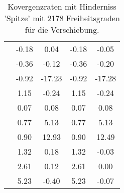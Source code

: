 \begin{table}
\begin{tabular}{c|cc|cc|}
\multicolumn{1}{|c|}{} & \multicolumn{1}{|c|}{     -0.18} & \multicolumn{1}{|c|}{      0.04} & \multicolumn{1}{|c|}{     -0.18} & \multicolumn{1}{|c|}{     -0.05} \\ 
\multicolumn{1}{|c|}{} & \multicolumn{1}{|c|}{     -0.36} & \multicolumn{1}{|c|}{     -0.12} & \multicolumn{1}{|c|}{     -0.36} & \multicolumn{1}{|c|}{     -0.20} \\ 
\multicolumn{1}{|c|}{} & \multicolumn{1}{|c|}{     -0.92} & \multicolumn{1}{|c|}{    -17.23} & \multicolumn{1}{|c|}{     -0.92} & \multicolumn{1}{|c|}{    -17.28} \\ 
\multicolumn{1}{|c|}{} & \multicolumn{1}{|c|}{      1.15} & \multicolumn{1}{|c|}{     -0.24} & \multicolumn{1}{|c|}{      1.15} & \multicolumn{1}{|c|}{     -0.24} \\ 
\multicolumn{1}{|c|}{} & \multicolumn{1}{|c|}{      0.07} & \multicolumn{1}{|c|}{      0.08} & \multicolumn{1}{|c|}{      0.07} & \multicolumn{1}{|c|}{      0.08} \\ 
\multicolumn{1}{|c|}{} & \multicolumn{1}{|c|}{      0.77} & \multicolumn{1}{|c|}{      5.13} & \multicolumn{1}{|c|}{      0.77} & \multicolumn{1}{|c|}{      5.13} \\ 
\multicolumn{1}{|c|}{} & \multicolumn{1}{|c|}{      0.90} & \multicolumn{1}{|c|}{     12.93} & \multicolumn{1}{|c|}{      0.90} & \multicolumn{1}{|c|}{     12.49} \\ 
\multicolumn{1}{|c|}{} & \multicolumn{1}{|c|}{      1.32} & \multicolumn{1}{|c|}{      0.18} & \multicolumn{1}{|c|}{      1.32} & \multicolumn{1}{|c|}{     -0.03} \\ 
\multicolumn{1}{|c|}{} & \multicolumn{1}{|c|}{      2.61} & \multicolumn{1}{|c|}{      0.12} & \multicolumn{1}{|c|}{      2.61} & \multicolumn{1}{|c|}{      0.00} \\ 
\multicolumn{1}{|c|}{} & \multicolumn{1}{|c|}{      5.23} & \multicolumn{1}{|c|}{     -0.40} & \multicolumn{1}{|c|}{      5.23} & \multicolumn{1}{|c|}{     -0.07} \\ 
\hline 
\end{tabular}\caption{Kovergenzraten mit Hinderniss 'Spitze' mit 2178 Freiheitsgraden für die Verschiebung.}\label{tab:Rate_Spitze_level4}
\end{table} 
